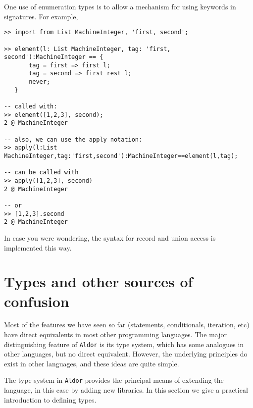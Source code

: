 \documentclass{article}
\newcommand{\Aldor}{{\tt Aldor}}
\begin{document}
One use of enumeration types is to allow a mechanism for using
keywords in signatures.
For example,
\begin{small}
\begin{verbatim}
>> import from List MachineInteger, 'first, second';

>> element(l: List MachineInteger, tag: 'first, second'):MachineInteger == {
       tag = first => first l;
       tag = second => first rest l;
       never;
   }

-- called with:
>> element([1,2,3], second);
2 @ MachineInteger

-- also, we can use the apply notation:
>> apply(l:List MachineInteger,tag:'first,second'):MachineInteger==element(l,tag);

-- can be called with
>> apply([1,2,3], second)
2 @ MachineInteger

-- or 
>> [1,2,3].second
2 @ MachineInteger
\end{verbatim}
\end{small}
In case you were wondering, the syntax for record and union access is
implemented this way.


\section{Types and other sources of confusion}

Most of the features we have seen so far (statements, conditionals,
iteration, etc) have direct equivalents in most other programming
languages.  The major distinguishing feature of \Aldor{} is its type
system, which has some analogues in other languages, but no direct
equivalent.  However, the underlying principles do exist in other
languages, and these ideas are quite simple.

The type system in \Aldor{} provides the principal means of extending
the language, in this case by adding new libraries.  In this section
we give a practical introduction to defining types.
\end{document}
